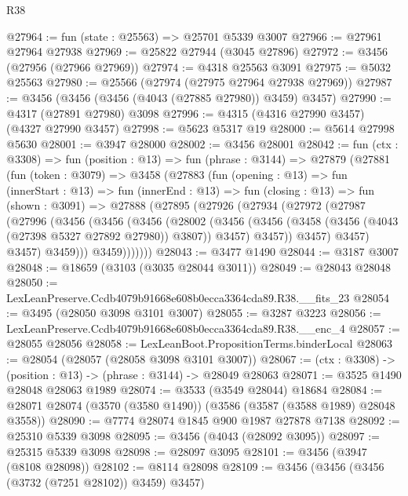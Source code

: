 \begin{lexlean}{R38}
\begin{coremodule}
@27964 := fun (state : @25563) => @25701 @5339 @3007
@27966 := @27961 @27964 @27938
@27969 := @25822 @27944 (@3045 @27896)
@27972 := @3456 (@27956 (@27966 @27969))
@27974 := @4318 @25563 @3091
@27975 := @5032 @25563
@27980 := @25566 (@27974 (@27975 @27964 @27938 @27969))
@27987 := @3456 (@3456 (@3456 (@4043 (@27885 @27980)) @3459) @3457)
@27990 := @4317 (@27891 @27980) @3098
@27996 := @4315 (@4316 @27990 @3457) (@4327 @27990 @3457)
@27998 := @5623 @5317 @19
@28000 := @5614 @27998 @5630
@28001 := @3947 @28000
@28002 := @3456 @28001
@28042 := fun (ctx : @3308) =>
  fun (position : @13) =>
  fun (phrase : @3144) =>
  @27879
    (@27881
      (fun (token : @3079) =>
      @3458
        (@27883
          (fun (opening : @13) =>
          fun (innerStart : @13) =>
          fun (innerEnd : @13) =>
          fun (closing : @13) =>
          fun (shown : @3091) =>
          @27888
            (@27895
              (@27926
                (@27934
                  (@27972
                    (@27987
                      (@27996
                        (@3456
                          (@3456
                            (@3456
                              (@28002
                                (@3456
                                  (@3456
                                    (@3458 (@3456 (@4043 (@27398 @5327 @27892 @27980)) @3807))
                                    @3457)
                                  @3457))
                              @3457)
                            @3457)
                          @3457)
                        @3459)))
                  @3459)))))))
@28043 := @3477 @1490
@28044 := @3187 @3007
@28048 := @18659 (@3103 (@3035 @28044 @3011))
@28049 := @28043 @28048
@28050 := LexLeanPreserve.Ccdb4079b91668e608b0ecca3364cda89.R38.__fits_23
@28054 := @3495 (@28050 @3098 @3101 @3007)
@28055 := @3287 @3223
@28056 := LexLeanPreserve.Ccdb4079b91668e608b0ecca3364cda89.R38.__enc_4
@28057 := @28055 @28056
@28058 := LexLeanBoot.PropositionTerms.binderLocal
@28063 := @28054 (@28057 (@28058 @3098 @3101 @3007))
@28067 := (ctx : @3308) -> (position : @13) -> (phrase : @3144) -> @28049 @28063
@28071 := @3525 @1490 @28048 @28063 @1989
@28074 := @3533 (@3549 @28044) @18684
@28084 := @28071 @28074 (@3570 (@3580 @1490)) (@3586 (@3587 (@3588 @1989) @28048 @3558))
@28090 := @7774 @28074 @1845 @900 @1987 @27878 @7138
@28092 := @25310 @5339 @3098
@28095 := @3456 (@4043 (@28092 @3095))
@28097 := @25315 @5339 @3098
@28098 := @28097 @3095
@28101 := @3456 (@3947 (@8108 @28098))
@28102 := @8114 @28098
@28109 := @3456 (@3456 (@3456 (@3732 (@7251 @28102)) @3459) @3457)

\end{coremodule}
\end{lexlean}
